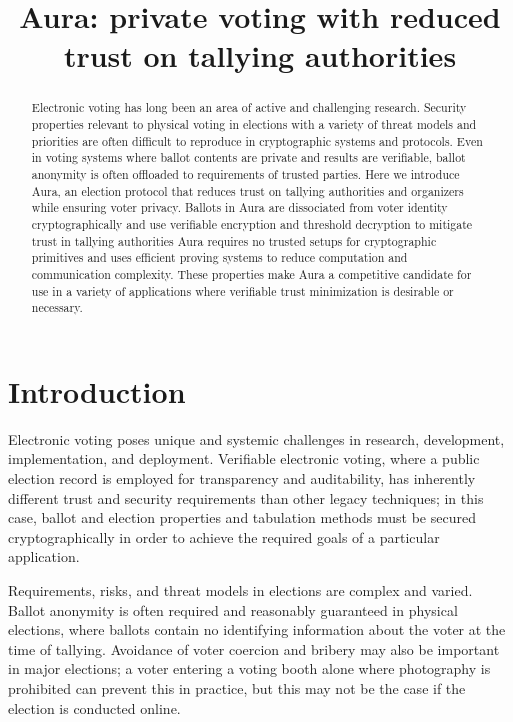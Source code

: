 \documentclass{llncs}
\begin{document}
\title{Aura: private voting with reduced trust on tallying authorities}
\author{}
\institute{}
\maketitle

\begin{abstract}
	Electronic voting has long been an area of active and challenging research.
	Security properties relevant to physical voting in elections with a variety of threat models and priorities are often difficult to reproduce in cryptographic systems and protocols.
    Even in voting systems where ballot contents are private and results are verifiable, ballot anonymity is often offloaded to requirements of trusted parties.
	Here we introduce Aura, an election protocol that reduces trust on tallying authorities and organizers while ensuring voter privacy.
	Ballots in Aura are dissociated from voter identity cryptographically and use verifiable encryption and threshold decryption to mitigate trust in tallying authorities
    Aura requires no trusted setups for cryptographic primitives and uses efficient proving systems to reduce computation and communication complexity.
	These properties make Aura a competitive candidate for use in a variety of applications where verifiable trust minimization is desirable or necessary.
\end{abstract}


\section{Introduction}

Electronic voting poses unique and systemic challenges in research, development, implementation, and deployment.
Verifiable electronic voting, where a public election record is employed for transparency and auditability, has inherently different trust and security requirements than other legacy techniques; in this case, ballot and election properties and tabulation methods must be secured cryptographically in order to achieve the required goals of a particular application.

Requirements, risks, and threat models in elections are complex and varied.
Ballot anonymity is often required and reasonably guaranteed in physical elections, where ballots contain no identifying information about the voter at the time of tallying.
Avoidance of voter coercion and bribery may also be important in major elections; a voter entering a voting booth alone where photography is prohibited can prevent this in practice, but this may not be the case if the election is conducted online.
\end{document}
